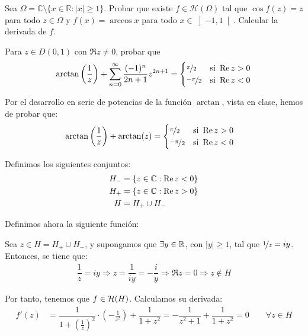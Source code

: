 \begin{ejercicio}
    Sea $\Omega = \mathbb{C} \setminus \{x \in \mathbb{R} : |x| \geq 1\}$. Probar que existe $f \in \mathcal{H}(\Omega)$ tal que $\cos f(z) = z$ para todo $z \in \Omega$ y $f(x) = \arccos x$ para todo $x \in \left] -1, 1 \right[$. Calcular la derivada de $f$.
\end{ejercicio}

\begin{ejercicio}
    Para $z \in D(0,1)$ con $\Re z \neq 0$, probar que
    \[
        \arctan\left(\frac{1}{z}\right) + \sum_{n=0}^\infty \frac{(-1)^n}{2n+1}z^{2n+1} = \begin{cases}
            \nicefrac{\pi}{2} & \text{si } \Re z > 0 \\
            \nicefrac{-\pi}{2} & \text{si } \Re z < 0
        \end{cases}
    \]

    Por el desarrollo en serie de potencias de la función $\arctan$, vista en clase, hemos de probar que:
    \begin{align*}
        \arctan\left(\frac{1}{z}\right) + \arctan(z) &= \begin{cases}
            \nicefrac{\pi}{2} & \text{si } \Re z > 0 \\
            \nicefrac{-\pi}{2} & \text{si } \Re z < 0
        \end{cases}
    \end{align*}

    Definimos los siguientes conjuntos:
    \begin{align*}
        H_{-} &= \{z\in \bb{C} : \Re z < 0\} \\
        H_{+} &= \{z\in \bb{C} : \Re z > 0\} \\
        H&= H_{+}\cup H_{-}
    \end{align*}

    Definimos ahora la siguiente función:

    Sea $z\in H=H_+\cup H_-$, y supongamos que $\exists y\in \bb{R}$, con $|y|\geq 1$, tal que $\nicefrac{1}{z}=iy$. Entonces, se tiene que:
    \begin{align*}
        \dfrac{1}{z}=iy\Longrightarrow z = \dfrac{1}{iy} = -\dfrac{i}{y}
        \Longrightarrow \Re z = 0\Longrightarrow z\notin H
    \end{align*}

    Por tanto, tenemos que $f\in \cc{H}(H)$. Calculamos su derivada:
    \begin{align*}
        f'(z) &= \dfrac{1}{1+\left(\frac{1}{z}\right)^2}\cdot \left(-\frac{1}{z^2}\right) + \dfrac{1}{1+z^2} = -\dfrac{1}{z^2+1}+\dfrac{1}{1+z^2} = 0\qquad \forall z\in H
    \end{align*}


\end{ejercicio}
